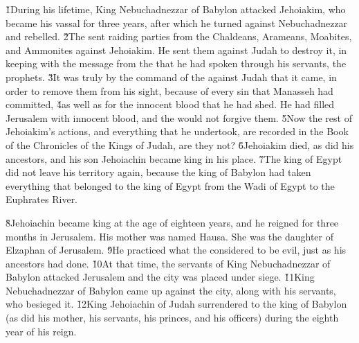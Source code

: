 \v{1}During his lifetime, King Nebuchadnezzar of Babylon attacked Jehoiakim, who became his vassal for three years, after which he turned against Nebuchadnezzar and rebelled. \v{2}The  sent raiding parties from the Chaldeans, Arameans, Moabites, and Ammonites against Jehoiakim. He sent them against Judah to destroy it, in keeping with the message from the  that he had spoken through his servants, the prophets. \v{3}It was truly by the command of the  against Judah that it came, in order to remove them from his sight, because of every sin that Manasseh had committed, \v{4}as well as for the innocent blood that he had shed. He had filled Jerusalem with innocent blood, and the  would not forgive them. \v{5}Now the rest of Jehoiakim's actions, and everything that he undertook, are recorded in the Book of the Chronicles of the Kings of Judah, are they not? \v{6}Jehoiakim died, as did his ancestors, and his son Jehoiachin became king in his place. \v{7}The king of Egypt did not leave his territory again, because the king of Babylon had taken everything that belonged to the king of Egypt from the Wadi of Egypt to the Euphrates River.

\v{8}Jehoiachin became king at the age of eighteen years, and he reigned for three months in Jerusalem. His mother was named Hausa. She was the daughter of Elzaphan of Jerusalem. \v{9}He practiced what the  considered to be evil, just as his ancestors had done. \v{10}At that time, the servants of King Nebuchadnezzar of Babylon attacked Jerusalem and the city was placed under siege. \v{11}King Nebuchadnezzar of Babylon came up against the city, along with his servants, who besieged it. \v{12}King Jehoiachin of Judah surrendered to the king of Babylon (as did his mother, his servants, his princes, and his officers) during the eighth year of his reign.


